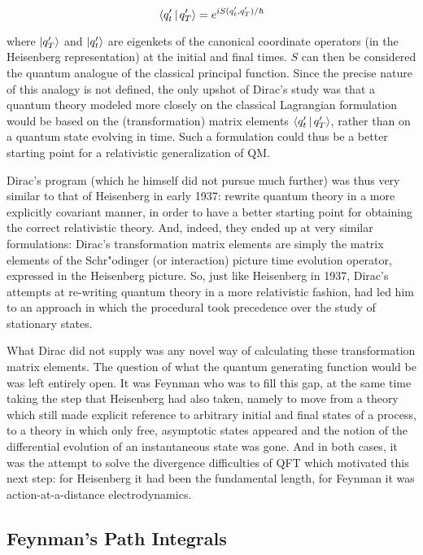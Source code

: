 \documentclass[12pt]{article}
\begin{document}
\begin{equation}
\Braket{q_t' | q_T' } = e^{i S(q_t', q_T') / \hbar}
\end{equation}

where $\ket{q_T'}$ and $\ket{q_t'}$ are eigenkets of the canonical coordinate operators (in the Heisenberg representation) at the initial and final times. $S$ can then be considered the quantum analogue of the classical principal function. Since the precise nature of this analogy is not defined, the only upshot of Dirac's study was that a quantum theory modeled more closely on the classical Lagrangian formulation would be based on the (transformation) matrix elements $\Braket{q_t' | q_T' }$, rather than on a quantum state evolving in time. Such a formulation could thus be a better starting point for a relativistic generalization of QM.

Dirac's program (which he himself did not pursue much further) was thus very similar to that of Heisenberg in early 1937: rewrite quantum theory in a more explicitly covariant manner, in order to have a better starting point for obtaining the correct relativistic theory. And, indeed, they ended up at very similar formulations: Dirac's transformation matrix elements are simply the matrix elements of the Schr"odinger (or interaction) picture time evolution operator, expressed in the Heisenberg picture. So, just like Heisenberg in 1937, Dirac's attempts at re-writing quantum theory in a more relativistic fashion, had led him to an approach in which the procedural took precedence over the study of stationary states.

What Dirac did not supply was any novel way of calculating these transformation matrix elements. The question of what the quantum generating function would be was left entirely open. It was Feynman who was to fill this gap, at the same time taking the step that Heisenberg had also taken, namely to move from a theory which still made explicit reference to arbitrary initial and final states of a process, to a theory in which only free, asymptotic states appeared and the notion of the differential evolution of an instantaneous state was gone. And in both cases, it was the attempt to solve the divergence difficulties of QFT which motivated this next step: for Heisenberg it had been the fundamental length, for Feynman it was action-at-a-distance electrodynamics.


\subsection{Feynman's Path Integrals}
\end{document}
